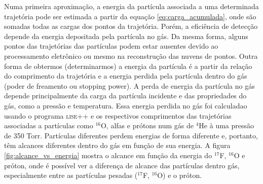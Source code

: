 \documentclass[a4paper,12pt,oneside]{book}
\begin{document}
\par Numa primeira aproximação, a energia da partícula associada a uma determinada trajetória pode ser estimada a partir da equação \ref{eq:carga_acumulada}, onde são somadas todas as cargas dos pontos da trajetória. Porém, a eficiência de detecção depende da energia depositada pela partícula no gás. Da mesma forma, alguns pontos das trajetórias das partículas podem estar ausentes devido ao processamento eletrônico ou mesmo na reconstrução das nuvens de pontos. Outra forma de obtermos (determinarmos) a energia da partícula é a partir da relação do comprimento da trajetória e a energia perdida pela partícula dentro do gás (poder de freamento ou stopping power). A perda de energia da partícula no gás depende principalmente da carga da partícula incidente e das propriedades do gás, como a pressão e temperatura. Essa energia perdida no gás foi calculadao usando o programa \textsc{lise++} \cite{lise++} e os respectivos comprimentos das trajetórias associadas a partículas como $^{16}$O, alfas e prótons num gás de $^4$He à uma pressão de 350 Torr. Partículas diferentes perdem energias de forma diferente e, portanto, têm alcances diferentes dentro do gás em função de sua energia. A figura \ref{fig:alcance_vs_energia} mostra o alcance em função da energia do $^{17}$F, $^{16}$O e próton, onde é possível ver a diferença de alcance das partículas dentro gás, especialmente entre as partículas pesadas ($^{17}$F, $^{16}$O) e o próton.

\end{document}
